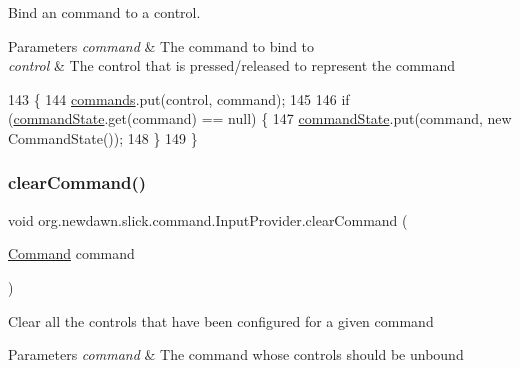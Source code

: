Bind an command to a control.


\begin{DoxyParams}{Parameters}
{\em command} & The command to bind to \\
\hline
{\em control} & The control that is pressed/released to represent the command \\
\hline
\end{DoxyParams}

\begin{DoxyCode}
143                                                               \{
144         \mbox{\hyperlink{classorg_1_1newdawn_1_1slick_1_1command_1_1_input_provider_ab2bd0c08506a59bc7457d7a87cf873d2}{commands}}.put(control, command);
145 
146         \textcolor{keywordflow}{if} (\mbox{\hyperlink{classorg_1_1newdawn_1_1slick_1_1command_1_1_input_provider_a343fea436b5ad6194968443cc58a632d}{commandState}}.get(command) == null) \{
147             \mbox{\hyperlink{classorg_1_1newdawn_1_1slick_1_1command_1_1_input_provider_a343fea436b5ad6194968443cc58a632d}{commandState}}.put(command, \textcolor{keyword}{new} CommandState());
148         \}
149     \}
\end{DoxyCode}
\mbox{\label{classorg_1_1newdawn_1_1slick_1_1command_1_1_input_provider_a0d501c7aae3af7e873195b3b3be6f167}} 
\subsubsection{\texorpdfstring{clear\+Command()}{clearCommand()}}
{\footnotesize\ttfamily void org.\+newdawn.\+slick.\+command.\+Input\+Provider.\+clear\+Command (\begin{DoxyParamCaption}\item[{\mbox{\hyperlink{interfaceorg_1_1newdawn_1_1slick_1_1command_1_1_command}{Command}}}]{command }\end{DoxyParamCaption})\hspace{0.3cm}{\ttfamily [inline]}}

Clear all the controls that have been configured for a given command


\begin{DoxyParams}{Parameters}
{\em command} & The command whose controls should be unbound \\
\hline
\end{DoxyParams}

